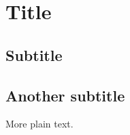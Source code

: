 \documentclass{article}
\begin{document}
\section{Title}

\subsection{Subtitle}




\subsection{Another subtitle}

More plain text.



\end{document}
